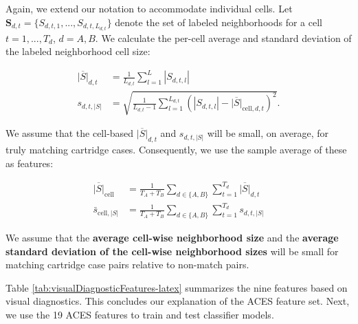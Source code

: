 \documentclass[11pt,]{isuthesis}
\begin{document}
Again, we extend our notation to accommodate individual cells.
Let \(\pmb{S}_{d,t} = \{S_{d,t,1},...,S_{d,t,L_{d,t}}\}\) denote the set of labeled neighborhoods for a cell \(t = 1,...,T_d\), \(d = A,B\).
We calculate the per-cell average and standard deviation of the labeled neighborhood cell size:

\begin{align*}
\overline{|S|}_{d,t} &= \frac{1}{L_{d,t}} \sum_{l=1}^L |S_{d,t,l}| \\
s_{d,t,|S|} &= \sqrt{\frac{1}{L_{d,t} - 1} \sum_{l=1}^{L_{d,t}} (|S_{d,t,l}| - \overline{|S|}_{\text{cell},d,t})^2}.
\end{align*}

We assume that the cell-based \(\overline{|S|}_{d,t}\) and \(s_{d,t,|S|}\) will be small, on average, for truly matching cartridge cases.
Consequently, we use the sample average of these as features:

\begin{align*}
\overline{|S|}_{\text{cell}} &= \frac{1}{T_A + T_B} \sum_{d \in \{A,B\}} \sum_{t=1}^{T_d} \overline{|S|}_{d,t} \\
\bar{s}_{\text{cell},|S|} &= \frac{1}{T_A + T_B} \sum_{d \in \{A,B\}} \sum_{t=1}^{T_d} s_{d,t,|S|}
\end{align*}

We assume that the \textbf{average cell-wise neighborhood size} and the \textbf{average standard deviation of the cell-wise neighborhood sizes} will be small for matching cartridge case pairs relative to non-match pairs.

Table \ref{tab:visualDiagnosticFeatures-latex} summarizes the nine features based on visual diagnostics.
This concludes our explanation of the ACES feature set.
Next, we use the 19 ACES features to train and test classifier models.
\end{document}
